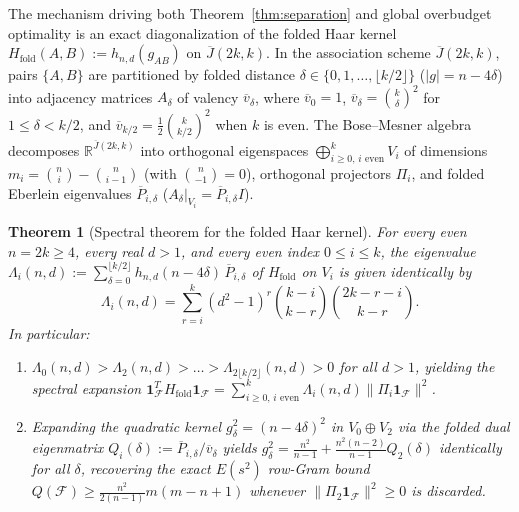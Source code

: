 \documentclass[11pt,reqno]{amsart}
\newtheorem{theorem}{Theorem}
\theoremstyle{definition}
\theoremstyle{remark}
\newcommand{\Jbar}{\overline{J}}
\newcommand{\F}{\mathcal{F}}
\begin{document}
The mechanism driving both Theorem~\ref{thm:separation} and global overbudget optimality is an exact diagonalization of the folded Haar kernel $H_{\mathrm{fold}}(A,B) := h_{n,d}(g_{AB})$ on $\Jbar(2k,k)$. In the association scheme $\Jbar(2k,k)$, pairs $\{A,B\}$ are partitioned by folded distance $\delta \in \{0,1,\dots,\lfloor k/2 \rfloor\}$ ($|g| = n - 4\delta$) into adjacency matrices $A_\delta$ of valency $\overline{v}_\delta$, where $\overline{v}_0 = 1$, $\overline{v}_\delta = \binom{k}{\delta}^2$ for $1 \le \delta < k/2$, and $\overline{v}_{k/2} = \frac{1}{2}\binom{k}{k/2}^2$ when $k$ is even. The Bose--Mesner algebra decomposes $\mathbb{R}^{\Jbar(2k,k)}$ into orthogonal eigenspaces $\bigoplus_{i \ge 0,\, i\text{ even}}^k V_i$ of dimensions $m_i = \binom{n}{i} - \binom{n}{i-1}$ (with $\binom{n}{-1}=0$), orthogonal projectors $\Pi_i$, and folded Eberlein eigenvalues $\overline{P}_{i,\delta}$ ($A_\delta|_{V_i} = \overline{P}_{i,\delta} I$).

\begin{theorem}[Spectral theorem for the folded Haar kernel]\label{thm:spectral}
For every even $n = 2k \ge 4$, every real $d > 1$, and every even index $0 \le i \le k$, the eigenvalue $\Lambda_i(n,d) := \sum_{\delta=0}^{\lfloor k/2 \rfloor} h_{n,d}(n - 4\delta)\,\overline{P}_{i,\delta}$ of $H_{\mathrm{fold}}$ on $V_i$ is given identically by
\begin{equation}\label{eq:lambda_closed}
\Lambda_i(n,d) = \sum_{r=i}^{k} (d^2 - 1)^r \binom{k-i}{k-r} \binom{2k - r - i}{k - r}.
\end{equation}
In particular:
\begin{enumerate}
\item[(a)] $\Lambda_0(n,d) > \Lambda_2(n,d) > \dots > \Lambda_{2\lfloor k/2 \rfloor}(n,d) > 0$ for all $d > 1$, yielding the spectral expansion $\mathbf{1}_{\F}^T H_{\mathrm{fold}} \mathbf{1}_{\F} = \sum_{i \ge 0,\, i\text{ even}}^k \Lambda_i(n,d)\|\Pi_i \mathbf{1}_{\F}\|^2$.
\item[(b)] Expanding the quadratic kernel $g_\delta^2 = (n - 4\delta)^2$ in $V_0 \oplus V_2$ via the folded dual eigenmatrix $Q_i(\delta) := \overline{P}_{i,\delta}/\overline{v}_\delta$ yields $g_\delta^2 = \frac{n^2}{n-1} + \frac{n^2(n-2)}{n-1} Q_2(\delta)$ identically for all $\delta$, recovering the exact $E(s^2)$ row-Gram bound $Q(\F) \ge \frac{n^2}{2(n-1)} m(m - n + 1)$ whenever $\|\Pi_2 \mathbf{1}_{\F}\|^2 \ge 0$ is discarded.
\end{enumerate}
\end{theorem}
\end{document}
